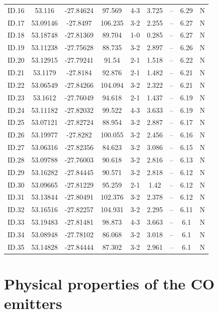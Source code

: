 \begin{table}[!h]
\begin{tabular}{ccccccccc}
ID.16 & 53.116 & -27.84624 & 97.569 & 4-3 & 3.725 & -- & 6.29 & N \\
ID.17 & 53.09146 & -27.8497 & 106.235 & 3-2 & 2.255 & -- & 6.27 & N \\
ID.18 & 53.18748 & -27.81369 & 89.704 & 1-0 & 0.285 & -- & 6.27 & N \\
ID.19 & 53.11238 & -27.75628 & 88.735 & 3-2 & 2.897 & -- & 6.26 & N \\
ID.20 & 53.12915 & -27.79241 & 91.54 & 2-1 & 1.518 & -- & 6.22 & N \\
ID.21 & 53.1179 & -27.8184 & 92.876 & 2-1 & 1.482 & -- & 6.21 & N \\
ID.22 & 53.06549 & -27.84266 & 104.094 & 3-2 & 2.322 & -- & 6.21 & N \\
ID.23 & 53.1612 & -27.76049 & 94.618 & 2-1 & 1.437 & -- & 6.19 & N \\
ID.24 & 53.11182 & -27.82032 & 99.522 & 4-3 & 3.633 & -- & 6.19 & N \\
ID.25 & 53.07121 & -27.82724 & 88.954 & 3-2 & 2.887 & -- & 6.17 & N \\
ID.26 & 53.19977 & -27.8282 & 100.055 & 3-2 & 2.456 & -- & 6.16 & N \\
ID.27 & 53.06316 & -27.82356 & 84.623 & 3-2 & 3.086 & -- & 6.15 & N \\
ID.28 & 53.09788 & -27.76003 & 90.618 & 3-2 & 2.816 & -- & 6.13 & N \\
ID.29 & 53.16282 & -27.84445 & 90.571 & 3-2 & 2.818 & -- & 6.12 & N \\
ID.30 & 53.09665 & -27.81229 & 95.259 & 2-1 & 1.42 & -- & 6.12 & N \\
ID.31 & 53.13844 & -27.80491 & 102.376 & 3-2 & 2.378 & -- & 6.12 & N \\
ID.32 & 53.16516 & -27.82257 & 104.931 & 3-2 & 2.295 & -- & 6.11 & N \\
ID.33 & 53.19483 & -27.81481 & 98.873 & 4-3 & 3.663 & -- & 6.1 & N \\
ID.34 & 53.08948 & -27.78102 & 86.068 & 3-2 & 3.018 & -- & 6.1 & N \\
ID.35 & 53.14828 & -27.84444 & 87.302 & 3-2 & 2.961 & -- & 6.1 & N \\
\end{tabular}
\end{table}\label{table:Catalog}

\section{Physical properties of the CO emitters}

